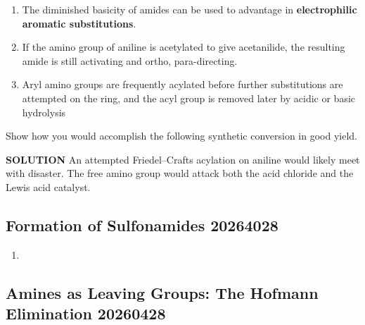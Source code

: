 \begin{enumerate}[resume]
    \item The diminished basicity of amides can be used to advantage in \textbf{electrophilic aromatic substitutions}.
    \item If the amino group of aniline is acetylated to give acetanilide, the resulting amide is still activating and ortho, para-directing. %
    \item Aryl amino groups are frequently acylated before further substitutions are attempted on the ring, and the acyl group is removed later by acidic or basic hydrolysis
\end{enumerate}

\begin{example} %
    Show how you would accomplish the following synthetic conversion in good yield.

    \textbf{SOLUTION} \quad An attempted Friedel–Crafts acylation on aniline would likely meet with disaster. The free amino group would attack both the acid chloride and the Lewis acid catalyst.
\end{example}

\subsection{Formation of Sulfonamides 20264028}

\begin{enumerate}
    \item 
\end{enumerate}

\subsection{Amines as Leaving Groups: The Hofmann Elimination 20260428}

